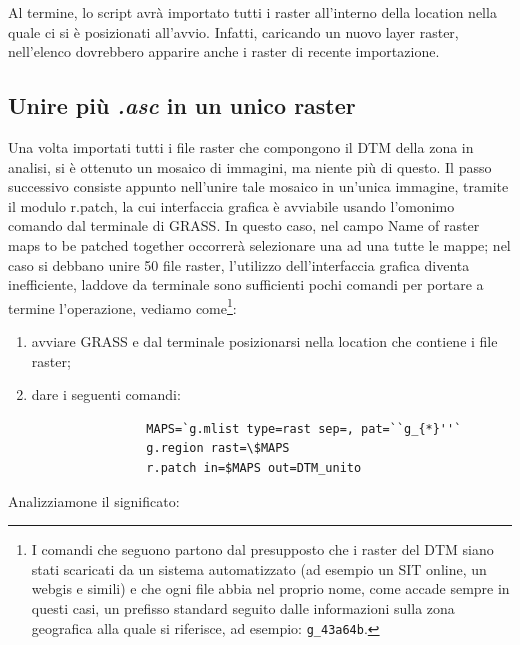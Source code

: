 		Al termine, lo script avrà importato tutti i raster all'interno della location nella quale ci si è posizionati all'avvio. Infatti, caricando un nuovo layer raster, nell'elenco dovrebbero apparire anche i raster di recente importazione.

		

	\subsection{Unire più \emph{.asc} in un unico raster}
		Una volta importati tutti i file raster che compongono il DTM della zona in analisi, si è ottenuto un mosaico di immagini, ma niente più di questo. Il passo successivo consiste appunto nell'unire tale mosaico in un'unica immagine, tramite il modulo r.patch, la cui interfaccia grafica è avviabile usando l'omonimo comando dal terminale di GRASS.  In questo caso, nel campo Name of raster maps to be patched together occorrerà selezionare una ad una tutte le mappe; nel caso si debbano unire 50 file raster, l'utilizzo dell'interfaccia grafica diventa inefficiente, laddove da terminale sono sufficienti pochi comandi per portare a termine l'operazione, vediamo come\footnote{I comandi che seguono partono dal presupposto che i raster del DTM siano stati scaricati da un sistema automatizzato (ad esempio un SIT online, un webgis e simili) e che ogni file abbia nel proprio nome, come accade sempre in questi casi, un prefisso standard seguito dalle informazioni sulla zona geografica alla quale si riferisce, ad esempio: \texttt{g\_43a64b}.}:
		
		\begin{enumerate}
			\item avviare GRASS e dal terminale posizionarsi nella location che contiene i file raster;
			\item dare i seguenti comandi:

			\begin{verbatim}
				MAPS=`g.mlist type=rast sep=, pat=``g_{*}''`
				g.region rast=\$MAPS
				r.patch in=$MAPS out=DTM_unito
			\end{verbatim}
		\end{enumerate}
		
		Analizziamone il significato:
		
